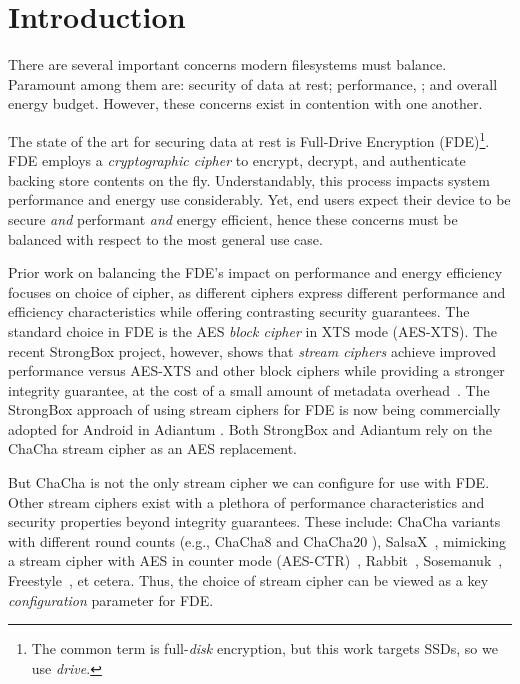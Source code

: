 \section{Introduction}\label{sec:introduction}

There are several important concerns modern filesystems must balance. Paramount
among them are: security of data at rest; performance, ; and overall energy budget. However, these concerns exist in
contention with one another.

The state of the art for securing data at rest is Full-Drive Encryption
(FDE)\footnote{The common term is full-\emph{disk} encryption, but this work
targets SSDs, so we use \emph{drive}.}. FDE employs a \emph{cryptographic
cipher} to encrypt, decrypt, and authenticate backing store contents on the fly.
Understandably, this process impacts system performance and
energy use considerably.  Yet, end users expect their device to be secure
\emph{and} performant \emph{and} energy efficient, hence these concerns must be
balanced with respect to the most general use case.

Prior work on balancing the FDE's impact on performance and energy efficiency
focuses on choice of cipher, as different ciphers express different performance
and efficiency characteristics while offering contrasting security guarantees.
The standard choice in FDE is the AES \emph{block cipher} in XTS mode (AES-XTS).
The recent StrongBox project, however, shows that \emph{stream ciphers} achieve
improved performance versus AES-XTS and other block ciphers while providing a
stronger integrity guarantee, at the cost of a small amount of metadata
overhead~\cite{StrongBox}. The StrongBox approach of using stream ciphers for FDE 
is now being commercially adopted for Android in Adiantum \cite{Adiantum}. 
Both StrongBox and Adiantum rely on the ChaCha stream cipher as an AES replacement.


But ChaCha is not the only stream cipher we can configure for use with FDE.
Other stream ciphers exist with a plethora of performance characteristics and
security properties beyond integrity guarantees. These include: ChaCha variants 
with different round counts (e.g., ChaCha8 \cite{ChaCha8} and ChaCha20 \cite{ChaCha20}), 
SalsaX~\cite{SalsaX}, mimicking a stream cipher
with AES in counter mode (AES-CTR)~\cite{AES-CTR}, Rabbit~\cite{Rabbit},
Sosemanuk~\cite{Sosemanuk}, Freestyle~\cite{Freestyle}, et cetera. Thus, the
choice of stream cipher can be viewed as a key \emph{configuration} parameter
for FDE.

